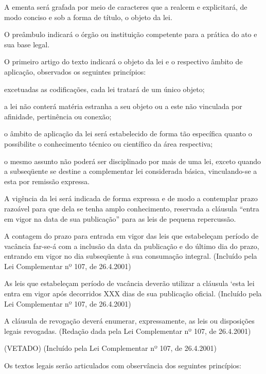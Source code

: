 \documentclass[calibri]{brlex2}
\begin{document}
\art A ementa será grafada por meio de caracteres que a realcem e explicitará, de modo conciso e sob a forma de título, o objeto da lei.

\art O preâmbulo indicará o órgão ou instituição competente para a prática do ato e sua base legal.


\art O primeiro artigo do texto indicará o objeto da lei e o respectivo âmbito de aplicação, observados os seguintes princípios:

\inc excetuadas as codificações, cada lei tratará de um único objeto;

\inc a lei não conterá matéria estranha a seu objeto ou a este não vinculada por afinidade, pertinência ou conexão;

\inc o âmbito de aplicação da lei será estabelecido de forma tão específica quanto o possibilite o conhecimento técnico ou científico da área respectiva;

\inc o mesmo assunto não poderá ser disciplinado por mais de uma lei, exceto quando a subseqüente se destine a complementar lei considerada básica, vinculando-se a esta por remissão expressa.

\art A vigência da lei será indicada de forma expressa e de modo a contemplar prazo razoável para que dela se tenha amplo conhecimento, reservada a cláusula ``entra em vigor na data de sua publicação'' para as leis de pequena repercussão.

\so A contagem do prazo para entrada em vigor das leis que estabeleçam período de vacância far-se-á com a inclusão da data da publicação e do último dia do prazo, entrando em vigor no dia subseqüente à sua consumação integral.    (Incluído pela Lei Complementar nº 107, de 26.4.2001)

\so As leis que estabeleçam período de vacância deverão utilizar a cláusula ‘esta lei entra em vigor após decorridos XXX dias de sua publicação oficial.     (Incluído pela Lei Complementar nº 107, de 26.4.2001)

\art A cláusula de revogação deverá enumerar, expressamente, as leis ou disposições legais revogadas.    (Redação dada pela Lei Complementar nº 107, de 26.4.2001)

\parun (VETADO)     (Incluído pela Lei Complementar nº 107, de 26.4.2001)


\art Os textos legais serão articulados com observância dos seguintes princípios:
\end{document}
